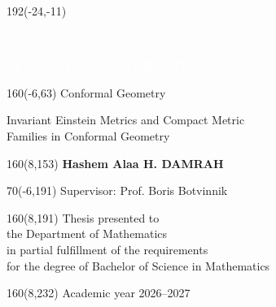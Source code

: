 \documentclass[12pt,a4paper,oneside]{book}
\begin{document}
  \thispagestyle{empty}
  \newcommand{\form}[1]{\scalebox{1.087}{\boldmath{#1}}}
  \sffamily

  \begin{textblock}{192}(-24,-11)
  \colorbox{uogreen}{\hspace{127mm}\ \parbox[c][18truemm]{66mm}{\textcolor{white}{DEPARTMENT OF MATHEMATICS}}}
  \end{textblock}

  \begin{textblock}{160}(-6,63)
  \textblockcolour{}
  \vspace{-\parskip}
  \flushleft
  \fontsize{42}{45}\selectfont \textcolor{uogreen}{Conformal Geometry}\\[5.5mm]
  \fontsize{18}{22}\selectfont \parbox{20cm}{Invariant Einstein Metrics and Compact Metric \\[0.2em]Families in Conformal Geometry}
  \end{textblock}

  \begin{textblock}{160}(8,153)
  \textblockcolour{}
  \vspace{-\parskip}
  \flushright
  \fontsize{14}{16}\selectfont \textbf{Hashem Alaa H. DAMRAH}
  \end{textblock}

  \begin{textblock}{70}(-6,191)
  \textblockcolour{}
  \vspace{-\parskip}
  \flushleft
  Supervisor: Prof. Boris Botvinnik\\[-2pt]
  \end{textblock}

  \begin{textblock}{160}(8,191)
  \textblockcolour{}
  \vspace{-\parskip}
  \flushright
  Thesis presented to\\[4.5pt]
  the Department of Mathematics\\[4.5pt]
  in partial fulfillment of the requirements \\[4.5pt]
  for the degree of Bachelor of Science in Mathematics
  \end{textblock}

  \begin{textblock}{160}(8,232)
  \textblockcolour{}
  \vspace{-\parskip}
  \flushright
  Academic year 2026--2027
  \end{textblock}
\end{document}
